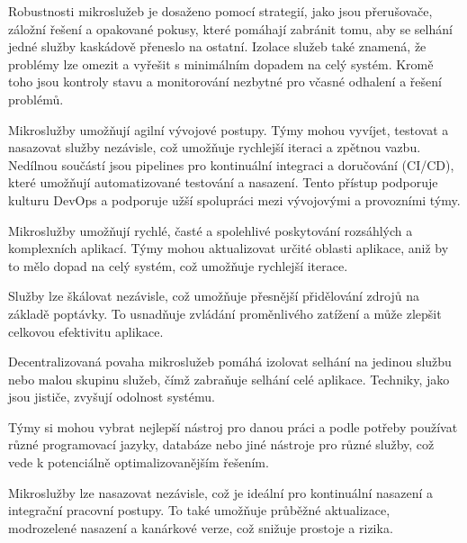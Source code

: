 
Robustnosti mikroslužeb je dosaženo pomocí strategií, jako jsou přerušovače, záložní řešení a opakované pokusy, které pomáhají zabránit tomu, aby se selhání jedné služby kaskádově přeneslo na ostatní. Izolace služeb také znamená, že problémy lze omezit a vyřešit s minimálním dopadem na celý systém. Kromě toho jsou kontroly stavu a monitorování nezbytné pro včasné odhalení a řešení problémů.


Mikroslužby umožňují agilní vývojové postupy. Týmy mohou vyvíjet, testovat a nasazovat služby nezávisle, což umožňuje rychlejší iteraci a zpětnou vazbu. Nedílnou součástí jsou pipelines pro kontinuální integraci a doručování (CI/CD), které umožňují automatizované testování a nasazení. Tento přístup podporuje kulturu DevOps a podporuje užší spolupráci mezi vývojovými a provozními týmy.




Mikroslužby umožňují rychlé, časté a spolehlivé poskytování rozsáhlých a komplexních aplikací. Týmy mohou aktualizovat určité oblasti aplikace, aniž by to mělo dopad na celý systém, což umožňuje rychlejší iterace.


Služby lze škálovat nezávisle, což umožňuje přesnější přidělování zdrojů na základě poptávky. To usnadňuje zvládání proměnlivého zatížení a může zlepšit celkovou efektivitu aplikace.


Decentralizovaná povaha mikroslužeb pomáhá izolovat selhání na jedinou službu nebo malou skupinu služeb, čímž zabraňuje selhání celé aplikace. Techniky, jako jsou jističe, zvyšují odolnost systému.


Týmy si mohou vybrat nejlepší nástroj pro danou práci a podle potřeby používat různé programovací jazyky, databáze nebo jiné nástroje pro různé služby, což vede k potenciálně optimalizovanějším řešením.


Mikroslužby lze nasazovat nezávisle, což je ideální pro kontinuální nasazení a integrační pracovní postupy. To také umožňuje průběžné aktualizace, modrozelené nasazení a kanárkové verze, což snižuje prostoje a rizika.

